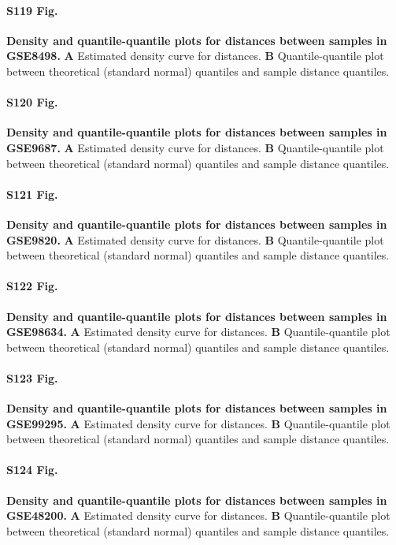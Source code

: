 \documentclass[10pt,letterpaper]{article}
\begin{document}
\paragraph*{S119 Fig.}
\hypertarget{S119_Fig}{
{\bf Density and quantile-quantile plots for distances between samples in GSE8498.} \textbf{A} Estimated density curve for distances. \textbf{B} Quantile-quantile plot between theoretical (standard normal) quantiles and sample distance quantiles.}

\paragraph*{S120 Fig.}
\hypertarget{S120_Fig}{
{\bf Density and quantile-quantile plots for distances between samples in GSE9687.} \textbf{A} Estimated density curve for distances. \textbf{B} Quantile-quantile plot between theoretical (standard normal) quantiles and sample distance quantiles.}

\paragraph*{S121 Fig.}
\hypertarget{S121_Fig}{
{\bf Density and quantile-quantile plots for distances between samples in GSE9820.} \textbf{A} Estimated density curve for distances. \textbf{B} Quantile-quantile plot between theoretical (standard normal) quantiles and sample distance quantiles.}

\paragraph*{S122 Fig.}
\hypertarget{S122_Fig}{
{\bf Density and quantile-quantile plots for distances between samples in GSE98634.} \textbf{A} Estimated density curve for distances. \textbf{B} Quantile-quantile plot between theoretical (standard normal) quantiles and sample distance quantiles.}

\paragraph*{S123 Fig.}
\hypertarget{S123_Fig}{
{\bf Density and quantile-quantile plots for distances between samples in GSE99295.} \textbf{A} Estimated density curve for distances. \textbf{B} Quantile-quantile plot between theoretical (standard normal) quantiles and sample distance quantiles.}

\paragraph*{S124 Fig.}
\hypertarget{S124_Fig}{
{\bf Density and quantile-quantile plots for distances between samples in GSE48200.} \textbf{A} Estimated density curve for distances. \textbf{B} Quantile-quantile plot between theoretical (standard normal) quantiles and sample distance quantiles.}
\end{document}
